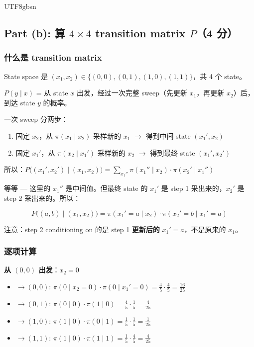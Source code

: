 \documentclass[11pt]{article}
\begin{document}
\begin{CJK}{UTF8}{gbsn}
\subsection{Part (b): 算 $4 \times 4$ transition matrix $P$（4 分）}

\subsubsection{什么是 transition matrix}

State space 是 $(x_1, x_2) \in \{(0,0), (0,1), (1,0), (1,1)\}$，共 4 个 state。

$P(y \mid x)$ = 从 state $x$ 出发，经过一次完整 sweep（先更新 $x_1$，再更新 $x_2$）后，到达 state $y$ 的概率。

一次 sweep 分两步：
\begin{enumerate}
  \item 固定 $x_2$，从 $\pi(x_1 \mid x_2)$ 采样新的 $x_1$ $\to$ 得到中间 state $(x_1', x_2)$
  \item 固定 $x_1'$，从 $\pi(x_2 \mid x_1')$ 采样新的 $x_2$ $\to$ 得到最终 state $(x_1', x_2')$
\end{enumerate}

所以：$P\big((x_1', x_2') \mid (x_1, x_2)\big) = \sum_{x_1''} \pi(x_1'' \mid x_2) \cdot \pi(x_2' \mid x_1'')$

等等 --- 这里的 $x_1''$ 是中间值。但最终 state 的 $x_1'$ 是 step 1 采出来的，$x_2'$ 是 step 2 采出来的。所以：

\[
  P\big((a, b) \mid (x_1, x_2)\big) = \pi(x_1' = a \mid x_2) \cdot \pi(x_2' = b \mid x_1' = a)
\]

注意：step 2 conditioning on 的是 step 1 \textbf{更新后的} $x_1' = a$，不是原来的 $x_1$。

\subsubsection{逐项计算}

\textbf{从 $(0,0)$ 出发}：$x_2 = 0$

\begin{itemize}[nosep]
  \item $\to (0,0)$: $\pi(0 \mid x_2{=}0) \cdot \pi(0 \mid x_1'{=}0) = \frac{4}{5} \cdot \frac{4}{5} = \frac{16}{25}$
  \item $\to (0,1)$: $\pi(0 \mid 0) \cdot \pi(1 \mid 0) = \frac{4}{5} \cdot \frac{1}{5} = \frac{4}{25}$
  \item $\to (1,0)$: $\pi(1 \mid 0) \cdot \pi(0 \mid 1) = \frac{1}{5} \cdot \frac{1}{5} = \frac{1}{25}$
  \item $\to (1,1)$: $\pi(1 \mid 0) \cdot \pi(1 \mid 1) = \frac{1}{5} \cdot \frac{4}{5} = \frac{4}{25}$
\end{itemize}


\end{CJK}
\end{document}
